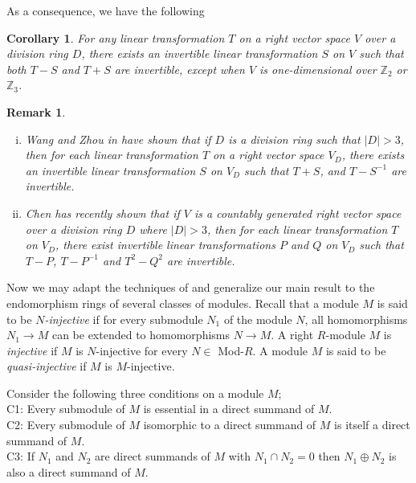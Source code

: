 \documentclass{amsart}
\newtheorem{corollary}[theorem]{Corollary}
\newtheorem{remark}[theorem]{Remark}
\begin{document}
As a consequence, we have the following

\begin{corollary}
For any linear transformation $T$ on a right vector space $V$ over a division ring $D$, there exists an invertible linear transformation $S$ on $V$ such that both $T-S$ and $T+S$ are invertible, except when $V$ is one-dimensional over $\mathbb Z_2$ or $\mathbb Z_3$. 
\end{corollary}

\begin{remark}
\begin{enumerate}[(i)]
\item \noindent Wang and Zhou in \cite{WZ} have shown that if $D$ is a division ring such that $|D|>3$, then for each linear transformation $T$ on a right vector space $V_D$, there exists an invertible linear transformation $S$ on $V_D$ such that $T+S$, and $T-S^{-1}$ are invertible.

\bigskip

\item Chen \cite{Chen2} has recently shown that if $V$ is a countably generated right vector space over a division ring $D$ where $|D|>3$, then for each linear transformation $T$ on $V_D$, there exist invertible linear transformations $P$ and $Q$ on $V_D$ such that $T-P$, $T-P^{-1}$ and $T^2-Q^2$ are invertible.    
\end{enumerate}
\end{remark}

\noindent Now we may adapt the techniques of \cite{KS1} and generalize our main result to the endomorphism rings of several classes of modules. Recall that a module $M$ is said to be {\it $N$-injective} if for every submodule $N_1$ of the module $N$, all homomorphisms $N_1\rightarrow M$ can be extended to homomorphisms $N\rightarrow M$. A right $R$-module $M$ is {\it injective} if $M$ is $N$-injective for every $N\in $ Mod-$R$. A module $M$ is said to be {\it quasi-injective} if $M$ is $M$-injective. 

\bigskip

\noindent Consider the following three conditions on a module $M$;\\
C1: Every submodule of $M$ is essential in a direct summand of $M$.\\
C2: Every submodule of $M$ isomorphic to a direct summand of $M$ is itself a direct summand of $M$.\\
C3: If $N_1$ and $N_2$ are direct summands of $M$ with $N_1\cap N_2=0$ then $N_1\oplus N_2$ is also a direct summand of $M$.
\end{document}
